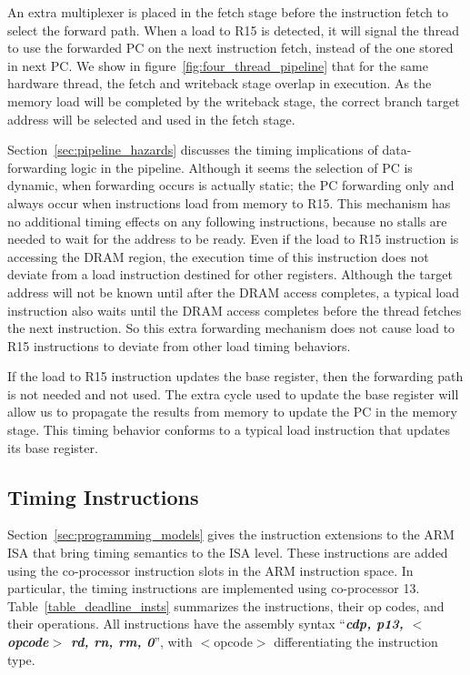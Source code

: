 An extra multiplexer is placed in the fetch stage before the instruction fetch to select the forward path.
When a load to R15 is detected, it will signal the thread to use the forwarded PC on the next instruction fetch, instead of the one stored in next PC.
We show in figure~\ref{fig:four_thread_pipeline} that for the same hardware thread, the fetch and writeback stage overlap in execution.  
As the memory load will be completed by the writeback stage, the correct branch target address will be selected and used in the fetch stage.

Section~\ref{sec:pipeline_hazards} discusses the timing implications of data-forwarding logic in the pipeline.
Although it seems the selection of PC is dynamic, when forwarding occurs is actually static; the PC forwarding only and always occur when instructions load from memory to R15.
This mechanism has no additional timing effects on any following instructions, because no stalls are needed to wait for the address to be ready. 
Even if the load to R15 instruction is accessing the DRAM region, the execution time of this instruction does not deviate from a load instruction destined for other registers.
Although the target address will not be known until after the DRAM access completes, a typical load instruction also waits until the DRAM access completes before the thread fetches the next instruction. 
So this extra forwarding mechanism does not cause load to R15 instructions to deviate from other load timing behaviors.

If the load to R15 instruction updates the base register, then the forwarding path is not needed and not used. 
The extra cycle used to update the base register will allow us to propagate the results from memory to update the PC in the memory stage.
This timing behavior conforms to a typical load instruction that updates its base register. 

\subsection{Timing Instructions}
\label{sec:timing_inst_implementation}
Section~\ref{sec:programming_models} gives the instruction extensions to the ARM ISA that bring timing semantics to the ISA level.
These instructions are added using the co-processor instruction slots in the ARM instruction space. 
In particular, the timing instructions are implemented using co-processor 13.
Table~\ref{table_deadline_insts} summarizes the instructions, their op codes, and their operations.
All instructions have the assembly syntax ``\textbf{\textit{cdp, p13, $<$opcode$>$ rd, rn, rm, 0}}'', with $<$opcode$>$ differentiating the instruction type.
   
